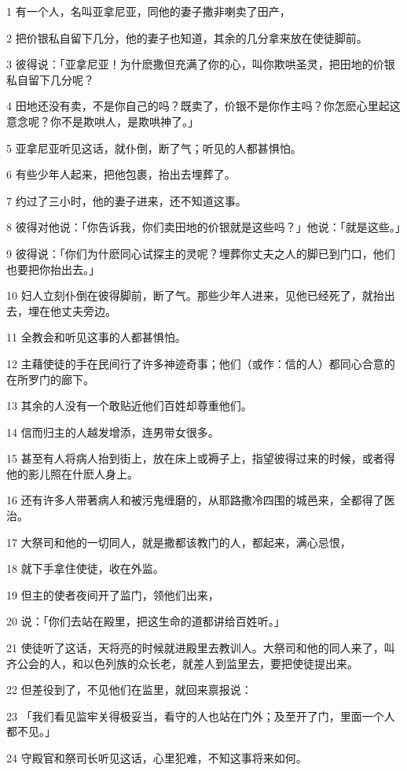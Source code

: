 \par 1 有一个人，名叫亚拿尼亚，同他的妻子撒非喇卖了田产，
\par 2 把价银私自留下几分，他的妻子也知道，其余的几分拿来放在使徒脚前。
\par 3 彼得说：「亚拿尼亚！为什麽撒但充满了你的心，叫你欺哄圣灵，把田地的价银私自留下几分呢？
\par 4 田地还没有卖，不是你自己的吗？既卖了，价银不是你作主吗？你怎麽心里起这意念呢？你不是欺哄人，是欺哄神了。」
\par 5 亚拿尼亚听见这话，就仆倒，断了气；听见的人都甚惧怕。
\par 6 有些少年人起来，把他包裹，抬出去埋葬了。
\par 7 约过了三小时，他的妻子进来，还不知道这事。
\par 8 彼得对他说：「你告诉我，你们卖田地的价银就是这些吗？」他说：「就是这些。」
\par 9 彼得说：「你们为什麽同心试探主的灵呢？埋葬你丈夫之人的脚已到门口，他们也要把你抬出去。」
\par 10 妇人立刻仆倒在彼得脚前，断了气。那些少年人进来，见他已经死了，就抬出去，埋在他丈夫旁边。
\par 11 全教会和听见这事的人都甚惧怕。
\par 12 主藉使徒的手在民间行了许多神迹奇事；他们（或作：信的人）都同心合意的在所罗门的廊下。
\par 13 其余的人没有一个敢贴近他们百姓却尊重他们。
\par 14 信而归主的人越发增添，连男带女很多。
\par 15 甚至有人将病人抬到街上，放在床上或褥子上，指望彼得过来的时候，或者得他的影儿照在什麽人身上。
\par 16 还有许多人带著病人和被污鬼缠磨的，从耶路撒冷四围的城邑来，全都得了医治。
\par 17 大祭司和他的一切同人，就是撒都该教门的人，都起来，满心忌恨，
\par 18 就下手拿住使徒，收在外监。
\par 19 但主的使者夜间开了监门，领他们出来，
\par 20 说：「你们去站在殿里，把这生命的道都讲给百姓听。」
\par 21 使徒听了这话，天将亮的时候就进殿里去教训人。大祭司和他的同人来了，叫齐公会的人，和以色列族的众长老，就差人到监里去，要把使徒提出来。
\par 22 但差役到了，不见他们在监里，就回来禀报说：
\par 23 「我们看见监牢关得极妥当，看守的人也站在门外；及至开了门，里面一个人都不见。」
\par 24 守殿官和祭司长听见这话，心里犯难，不知这事将来如何。
